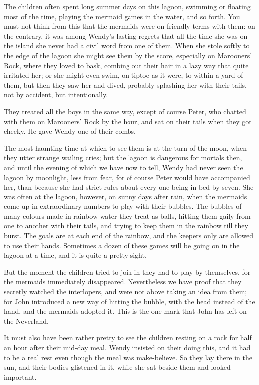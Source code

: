The children often spent long summer days on this lagoon, swimming or
floating most of the time, playing the mermaid games in the water, and
so forth. You must not think from this that the mermaids were on
friendly terms with them: on the contrary, it was among Wendy's lasting
regrets that all the time she was on the island she never had a civil
word from one of them. When she stole softly to the edge of the lagoon
she might see them by the score, especially on Marooners' Rock, where
they loved to bask, combing out their hair in a lazy way that quite
irritated her; or she might even swim, on tiptoe as it were, to within
a yard of them, but then they saw her and dived, probably splashing her
with their tails, not by accident, but intentionally.

They treated all the boys in the same way, except of course Peter, who
chatted with them on Marooners' Rock by the hour, and sat on their
tails when they got cheeky. He gave Wendy one of their combs.

The most haunting time at which to see them is at the turn of the moon,
when they utter strange wailing cries; but the lagoon is dangerous for
mortals then, and until the evening of which we have now to tell, Wendy
had never seen the lagoon by moonlight, less from fear, for of course
Peter would have accompanied her, than because she had strict rules
about every one being in bed by seven. She was often at the lagoon,
however, on sunny days after rain, when the mermaids come up in
extraordinary numbers to play with their bubbles. The bubbles of many
colours made in rainbow water they treat as balls, hitting them gaily
from one to another with their tails, and trying to keep them in the
rainbow till they burst. The goals are at each end of the rainbow, and
the keepers only are allowed to use their hands. Sometimes a dozen of
these games will be going on in the lagoon at a time, and it is quite a
pretty sight.

But the moment the children tried to join in they had to play by
themselves, for the mermaids immediately disappeared. Nevertheless we
have proof that they secretly watched the interlopers, and were not
above taking an idea from them; for John introduced a new way of
hitting the bubble, with the head instead of the hand, and the mermaids
adopted it. This is the one mark that John has left on the Neverland.

It must also have been rather pretty to see the children resting on a
rock for half an hour after their mid-day meal. Wendy insisted on their
doing this, and it had to be a real rest even though the meal was
make-believe. So they lay there in the sun, and their bodies glistened
in it, while she sat beside them and looked important.

